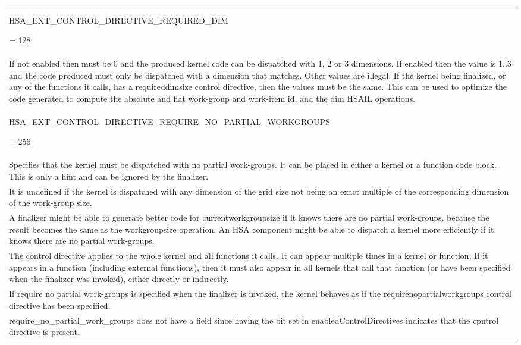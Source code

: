 \documentclass[final]{book}
\newcommand{\reftyp}[1]{#1}
\newcommand{\refenu}[1]{\reftyp{#1}}
\begin{document}
\begin{longtable}{@{\hspace{2em}}p{\linewidth-2em}}
\hspace{-2em}\hypertarget{group__finalizer_1gga143d9e622dfd7889d52fb5eb5ed1ffdba87989d5d2c63b0bb44b15e0788bfe850}{\refenu{HSA_\-EXT_\-CONTROL_\-DIRECTIVE_\-REQUIRED_\-DIM}} = 128\\If not enabled then must be 0 and the produced kernel code can be dispatched with 1, 2 or 3 dimensions. If enabled then the value is 1..3 and the code produced must only be dispatched with a dimension that matches. Other values are illegal. If the kernel being finalized, or any of the functions it calls, has a requireddimsize control directive, then the values must be the same. This can be used to optimize the code generated to compute the absolute and flat work-group and work-item id, and the dim HSAIL operations.\\[2mm]
\hspace{-2em}\hypertarget{group__finalizer_1gga143d9e622dfd7889d52fb5eb5ed1ffdba5b5049bc2b376e60b9b92337e343ee18}{\refenu{HSA_\-EXT_\-CONTROL_\-DIRECTIVE_\-REQUIRE_\-NO_\-PARTIAL_\-WORKGROUPS}} = 256\\Specifies that the kernel must be dispatched with no partial work-groups. It can be placed in either a kernel or a function code block. This is only a hint and can be ignored by the finalizer.\\[2mm]
It is undefined if the kernel is dispatched with any dimension of the grid size not being an exact multiple of the corresponding dimension of the work-group size.\\[2mm]
A finalizer might be able to generate better code for currentworkgroupsize if it knows there are no partial work-groups, because the result becomes the same as the workgroupsize operation. An HSA component might be able to dispatch a kernel more efficiently if it knows there are no partial work-groups.\\[2mm]
The control directive applies to the whole kernel and all functions it calls. It can appear multiple times in a kernel or function. If it appears in a function (including external functions), then it must also appear in all kernels that call that function (or have been specified when the finalizer was invoked), either directly or indirectly.\\[2mm]
If require no partial work-groups is specified when the finalizer is invoked, the kernel behaves as if the requirenopartialworkgroups control directive has been specified.\\[2mm]
require_\-no_\-partial_\-work_\-groups does not have a field since having the bit set in enabledControlDirectives indicates that the cpntrol directive is present.
\end{longtable}
\end{document}

